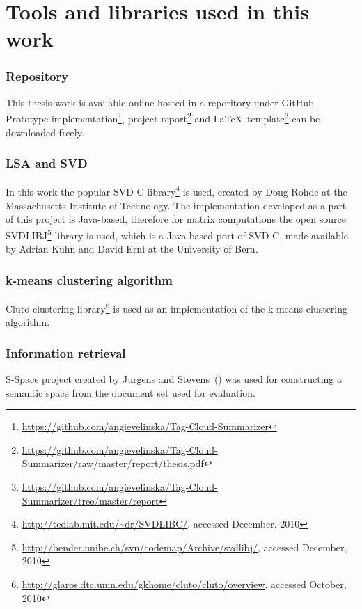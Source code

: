 \section{Tools and libraries used in this work}
\label{sec:implementation:tools_used}

\subsubsection{Repository}
This thesis work is available online hosted in a reporitory under GitHub. Prototype implementation\footnote{\url{https://github.com/angievelinska/Tag-Cloud-Summarizer}}, project report\footnote{\url{https://github.com/angievelinska/Tag-Cloud-Summarizer/raw/master/report/thesis.pdf}} and \LaTeX~template\footnote{\url{https://github.com/angievelinska/Tag-Cloud-Summarizer/tree/master/report}} can be downloaded freely. \\

\subsubsection{LSA and SVD}
In this work the popular SVD C library\footnote{\url{http://tedlab.mit.edu/~dr/SVDLIBC/}, accessed December, 2010}  is used, created by Doug Rohde at the Massachusetts Institute of Technology. The implementation developed as a part of this project is Java-based, therefore for matrix computations the open source SVDLIBJ\footnote{\url{http://bender.unibe.ch/svn/codemap/Archive/svdlibj/}, accessed December, 2010} library is used, which is a Java-based port of SVD C, made available by Adrian Kuhn and David Erni at the University of Bern. \\

\subsubsection{k-means clustering algorithm}
Cluto clustering library\footnote{\url{http://glaros.dtc.umn.edu/gkhome/cluto/cluto/overview}, accessed October, 2010} is used as an implementation of the k-means clustering algorithm.\\

\subsubsection{Information retrieval}
S-Space project created by  Jurgens and Stevens~(\cite{S-Space}) was used for constructing a semantic space from the document set used for evaluation. \\

